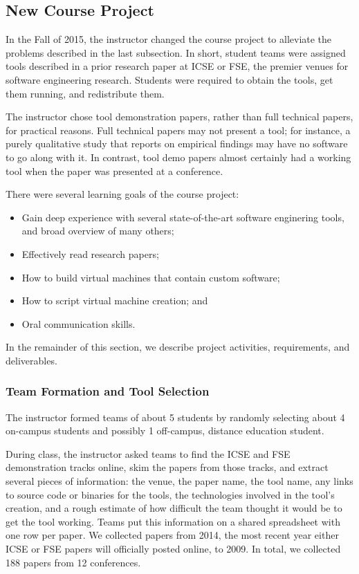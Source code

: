 \documentclass[10pt,conference]{IEEEtran}
\begin{document}
\subsection{New Course Project}\label{sec:thisProj}

In the Fall of 2015, the instructor changed the course project
to alleviate the problems described in the last subsection.
In short, student teams were assigned tools described in a 
prior research paper at ICSE or FSE, the premier 
venues for software engineering research.
Students were required to obtain the tools, get them running,
and redistribute them.

The instructor chose tool demonstration papers, rather than
full technical papers, for practical reasons.
Full technical papers may not present a tool; for 
instance, a purely qualitative study that reports on 
empirical findings may have no software to go along with it.
In contrast, tool demo papers almost certainly had a working
tool when the paper was presented at a conference. 

There were several learning goals of the course project:

\begin{itemize}
  \item Gain deep experience with several state-of-the-art
  		software enginering tools, and broad overview of many others;
  \item Effectively read research papers;
  \item How to build virtual machines that contain custom
  		software;
  \item How to script virtual machine creation; and
  \item Oral communication skills. 
\end{itemize}

In the remainder of this section, we describe project
activities, requirements, and deliverables.

\subsubsection{Team Formation and Tool Selection}

The instructor formed teams of about 5 students by randomly
selecting about 4 on-campus students and possibly 1 off-campus, distance
education student.

During class, the instructor asked teams to find the ICSE
and FSE demonstration tracks online, skim the papers from those
tracks, and extract several pieces of information:
the venue, the paper name, the tool name, any links to source
code or binaries for the tools, the technologies involved in the 
tool's creation, and a rough estimate of how 
difficult the team thought it would be to get the tool working.
Teams put this information on a shared spreadsheet with one row per paper.
We collected papers from 2014, the most recent year either ICSE or FSE
papers will officially posted online, to 2009.
In total, we collected 188 papers from 12 conferences.
\end{document}
